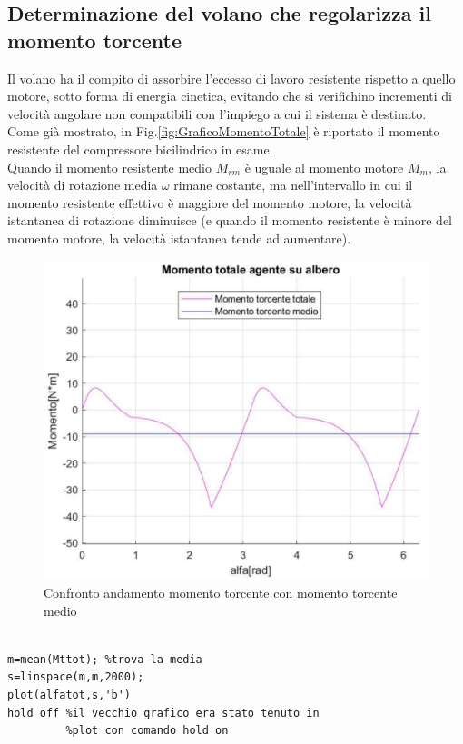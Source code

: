 \subsection{Determinazione del volano che regolarizza il momento torcente}
Il volano ha il compito di assorbire l’eccesso di lavoro resistente rispetto a quello motore, sotto forma di energia cinetica, evitando che si verifichino incrementi di velocità angolare non compatibili con l’impiego a cui il sistema è destinato. \\
Come già mostrato, in Fig.\ref{fig:GraficoMomentoTotale} è riportato il momento resistente del compressore bicilindrico in esame. \\
Quando il momento resistente medio $M_{rm}$ è uguale al momento motore $M_m$, la velocità di rotazione media $\omega$ rimane costante, ma nell’intervallo in cui il momento resistente effettivo è maggiore del momento motore, la velocità istantanea di rotazione diminuisce (e quando il momento resistente è minore del momento motore, la velocità istantanea tende ad aumentare). 
\begin{figure}[h]
    \centering
    \includegraphics[scale=0.5]{Immagini/GraficoMomentoMedio.png}
    \caption{Confronto andamento momento torcente con momento torcente medio}
    \label{fig:GraficoMomentoMedio}
\end{figure}
\begin{lstlisting}[frame=trBL]
%Momento torcente medio

m=mean(Mttot); %trova la media
s=linspace(m,m,2000);
plot(alfatot,s,'b')
hold off %il vecchio grafico era stato tenuto in 
         %plot con comando hold on
\end{lstlisting}
